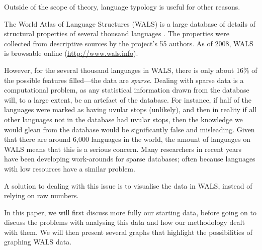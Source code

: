 \documentclass[11pt]{article}
\begin{document}
Outside of the scope of theory, language typology is useful for other reasons. %

The World Atlas of Language Structures (WALS) is a large database of details of structural properties of several thousand languages \cite{wals-2011}. The properties were collected from descriptive sources by the project's 55 authors. As of 2008, WALS is browsable online (\url{http://www.wals.info}).

However, for the several thousand languages in WALS, there is only about 16\% of the possible features filled---the data are \emph{sparse}.
Dealing with sparse data is a computational problem, as any statistical information drawn from the database will, to a large extent, be an artefact of the database. For instance, if half of the languages were marked as having uvular stops (unlikely), and then in reality if all other languages not in the database had uvular stops, then the knowledge we would glean from the database would be significantly false and misleading. Given that there are around 6,000 languages in the world, the amount of languages on WALS means that this is a serious concern. Many researchers in recent years have been developing work-arounds for sparse databases; often because languages with low resources have a similar problem. %

A solution to dealing with this issue is to visualise the data in WALS, instead of relying on raw numbers.



In this paper, we will first discuss more fully our starting data, before going on to discuss the problems with analysing this data and how our methodology dealt with them. We will then present several graphs that highlight the possibilities of graphing WALS data. 
\end{document}
